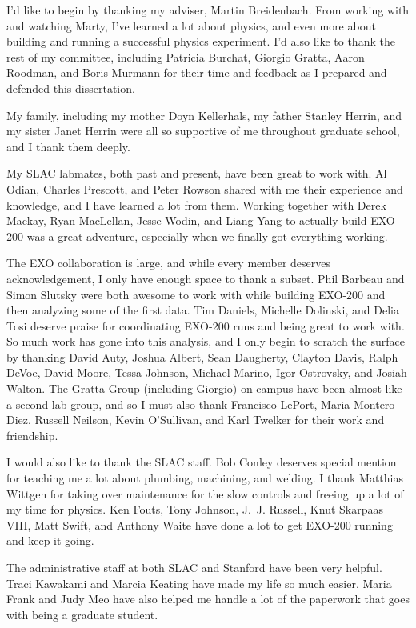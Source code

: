 I'd like to begin by thanking my adviser, Martin Breidenbach. From working with and watching Marty, I've learned a lot about physics, and even more about building and running a successful physics experiment. I'd also like to thank the rest of my committee, including Patricia Burchat, Giorgio Gratta, Aaron Roodman, and Boris Murmann for their time and feedback as I prepared and defended this dissertation.

My family, including my mother Doyn Kellerhals, my father Stanley Herrin, and my sister Janet Herrin were all so supportive of me throughout graduate school, and I thank them deeply. 

My SLAC labmates, both past and present, have been great to work with. Al Odian, Charles Prescott, and Peter Rowson shared with me their experience and knowledge, and I have learned a lot from them. Working together with Derek Mackay, Ryan MacLellan, Jesse Wodin, and Liang Yang to actually build EXO-200 was a great adventure, especially when we finally got everything working.

The EXO collaboration is large, and while every member deserves acknowledgement, I only have enough space to thank a subset. Phil Barbeau and Simon Slutsky were both awesome to work with while building EXO-200 and then analyzing some of the first data. Tim Daniels, Michelle Dolinski, and Delia Tosi deserve praise for coordinating EXO-200 runs and being great to work with. So much work has gone into this analysis, and I only begin to scratch the surface by thanking David Auty, Joshua Albert, Sean Daugherty, Clayton Davis, Ralph DeVoe, David Moore, Tessa Johnson, Michael Marino, Igor Ostrovsky, and Josiah Walton. The Gratta Group (including Giorgio) on campus have been almost like a second lab group, and so I must also thank Francisco LePort, Maria Montero-Diez, Russell Neilson, Kevin O'Sullivan, and Karl Twelker for their work and friendship.

I would also like to thank the SLAC staff. Bob Conley deserves special mention for teaching me a lot about plumbing, machining, and welding. I thank Matthias Wittgen for taking over maintenance for the slow controls and freeing up a lot of my time for physics. Ken Fouts, Tony Johnson, J.~J. Russell, Knut Skarpaas VIII, Matt Swift, and Anthony Waite have done a lot to get EXO-200 running and keep it going.

The administrative staff at both SLAC and Stanford have been very helpful. Traci Kawakami and Marcia Keating have made my life so much easier. Maria Frank and Judy Meo have also helped me handle a lot of the paperwork that goes with being a graduate student.

